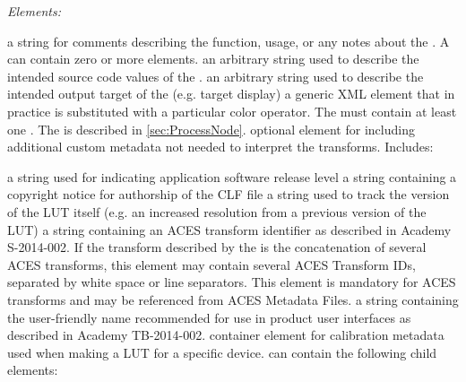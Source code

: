 \emph{Elements:}
\begin{xmlfields}
    \xmlitem[Description][optional] a string for comments describing the function, usage, or any notes about the . A  can contain zero or more  elements.
    \xmlitem[InputDescriptor][optional] an arbitrary string used to describe the intended source code values of the .
    \xmlitem[OutputDescriptor][optional] an arbitrary string used to describe the intended output target of the  (e.g. target display)
    \xmlitem[ProcessNode][required] a generic XML element that in practice is substituted with a particular color operator. The  must contain at least one . The  is described in \autoref{sec:ProcessNode}.
    \xmlitem[Info][optional] optional element for including additional custom metadata not needed to interpret the transforms. Includes:
        \begin{xmlfields}
            \xmlitem[AppRelease][optional] a string used for indicating application software release level
            \xmlitem[Copyright][optional] a string containing a copyright notice for authorship of the CLF file
            \xmlitem[Revision][optional] a string used to track the version of the LUT itself (e.g. an increased resolution from a previous version of the LUT)
            \xmlitem[ACEStransformID][optional] a string containing an ACES transform identifier as described in Academy S-2014-002. If the transform described by the  is the concatenation of several ACES transforms, this element may contain several ACES Transform IDs, separated by white space or line separators. This element is mandatory for ACES transforms and may be referenced from ACES Metadata Files. 
            \xmlitem[ACESuserName][optional] a string containing the user-friendly name recommended for use in product user interfaces as described in Academy TB-2014-002.
            \xmlitem[CalibrationInfo][optional] container element for calibration metadata used when making a LUT for a specific device.  can contain the following child elements:
                \begin{list}{}{\setlength{\itemsep}{4pt}}
                    \item {}
                    \item {}
                    \item {}
                    \item {}
                    \item {}
                    \item {}
                    \item {}
                \end{list}
        \end{xmlfields}
\end{xmlfields}